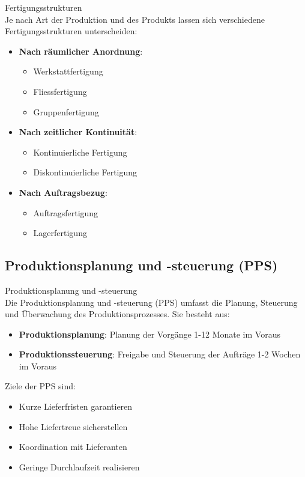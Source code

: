 \begin{concept}{Fertigungsstrukturen}\\
Je nach Art der Produktion und des Produkts lassen sich verschiedene Fertigungsstrukturen unterscheiden:
\begin{itemize}
    \item \textbf{Nach räumlicher Anordnung}:
    \begin{itemize}
        \item Werkstattfertigung
        \item Fliessfertigung
        \item Gruppenfertigung
    \end{itemize}
    \item \textbf{Nach zeitlicher Kontinuität}:
    \begin{itemize}
        \item Kontinuierliche Fertigung
        \item Diskontinuierliche Fertigung
    \end{itemize}
    \item \textbf{Nach Auftragsbezug}:
    \begin{itemize}
        \item Auftragsfertigung
        \item Lagerfertigung
    \end{itemize}
\end{itemize}
\end{concept}

\subsection{Produktionsplanung und -steuerung (PPS)}

\begin{definition}{Produktionsplanung und -steuerung}\\
Die Produktionsplanung und -steuerung (PPS) umfasst die Planung, Steuerung und Überwachung des Produktionsprozesses. Sie besteht aus:
\begin{itemize}
    \item \textbf{Produktionsplanung}: Planung der Vorgänge 1-12 Monate im Voraus
    \item \textbf{Produktionssteuerung}: Freigabe und Steuerung der Aufträge 1-2 Wochen im Voraus
\end{itemize}

Ziele der PPS sind:
\begin{itemize}
    \item Kurze Lieferfristen garantieren
    \item Hohe Liefertreue sicherstellen
    \item Koordination mit Lieferanten
    \item Geringe Durchlaufzeit realisieren
\end{itemize}
\end{definition}

